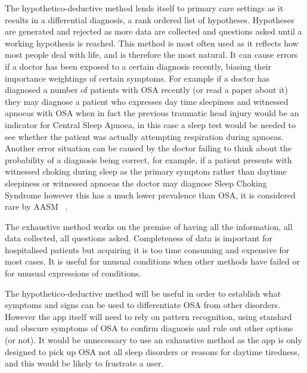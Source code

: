 The hypothetico-deductive method lends itself to primary care settings as it results in a differential diagnosis, a rank ordered list of hypotheses. Hypotheses are generated and rejected as more data are collected and questions asked until a working hypothesis is reached. This method is most often used as it reflects how most people deal with life, and is therefore the most natural. It can cause errors if a doctor has been exposed to a certain diagnosis recently, biasing their importance weightings of certain symptoms. For example if a doctor has diagnosed a number of patients with OSA recently (or read a paper about it) they may diagnose a patient who expresses day time sleepiness and witnessed apnoeas with OSA when in fact the previous traumatic head injury would be an indicator for Central Sleep Apnoea, in this case a sleep test would be needed to see whether the patient was actually attempting respiration during apnoeas. Another error situation can be caused by the doctor failing to think about the probability of a diagnosis being correct, for example, if a patient presents with witnessed choking during sleep as the primary symptom rather than daytime sleepiness or witnessed apnoeas the doctor may diagnose Sleep Choking Syndrome however this has a much lower prevalence than OSA, it is considered rare by AASM ~\cite{american2001international}.

The exhaustive method works on the premise of having all the information, all data collected, all questions asked. Completeness of data is important for hospitalised patients but acquiring it is too time consuming and expensive for most cases. It is useful for unusual conditions when other methods have failed or for unusual expressions of conditions. 

The hypothetico-deductive method will be useful in order to establish what symptoms and signs can be used to differentiate OSA from other disorders. However the app itself will need to rely on pattern recognition, using standard and obscure symptoms of OSA to confirm diagnosis and rule out other options (or not). It would be unnecessary to use an exhaustive method as the app is only designed to pick up OSA not all sleep disorders or reasons for daytime tiredness, and this would be likely to frustrate a user.
